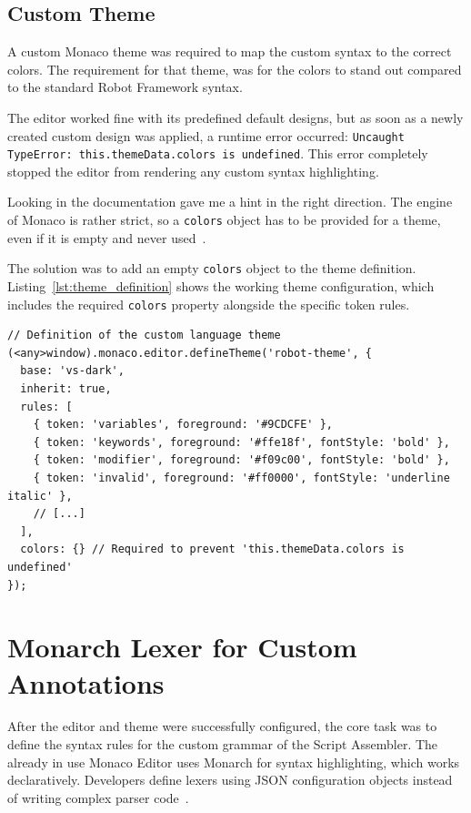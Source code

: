 \subsection{Custom Theme}

A custom Monaco theme was required to map the custom syntax to the correct colors. The requirement for that theme, was for the colors to stand out compared to the standard Robot Framework syntax.

The editor worked fine with its predefined default designs, but as soon as a newly created custom design was applied, a runtime error occurred: \texttt{Uncaught TypeError: this.themeData.colors is undefined}. This error completely stopped the editor from rendering any custom syntax highlighting.

Looking in the documentation gave me a hint in the right direction. The engine of Monaco is rather strict, so a \texttt{colors} object has to be provided for a theme, even if it is empty and never used~\cite{MonacoThemeColorsAPI}. 

The solution was to add an empty \texttt{colors} object to the theme definition. Listing~\ref{lst:theme_definition} shows the working theme configuration, which includes the required \texttt{colors} property alongside the specific token rules.

\begin{lstlisting}[caption={Custom monaco theme including the required color object}, label={lst:theme_definition}, float=htbp]
// Definition of the custom language theme
(<any>window).monaco.editor.defineTheme('robot-theme', {
  base: 'vs-dark',
  inherit: true,
  rules: [
    { token: 'variables', foreground: '#9CDCFE' },
    { token: 'keywords', foreground: '#ffe18f', fontStyle: 'bold' },
    { token: 'modifier', foreground: '#f09c00', fontStyle: 'bold' },
    { token: 'invalid', foreground: '#ff0000', fontStyle: 'underline italic' },
    // [...]
  ],
  colors: {} // Required to prevent 'this.themeData.colors is undefined'
});
\end{lstlisting}

\section{Monarch Lexer for Custom Annotations}

After the editor and theme were successfully configured, the core task was to define the syntax rules for the custom grammar of the Script Assembler. The already in use Monaco Editor uses Monarch for syntax highlighting, which works declaratively. Developers define lexers using JSON configuration objects instead of writing complex parser code~\cite{MonacoMonarchDocs}.

